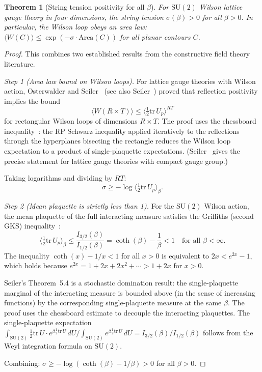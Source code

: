 \documentclass[11pt]{article}
\newtheorem{theorem}{Theorem}[section]
\theoremstyle{definition}
\newcommand{\SU}{\mathrm{SU}}
\newcommand{\tr}{\mathrm{tr}}
\begin{document}
\begin{theorem}[String tension positivity for all $\beta$]
\label{thm:string}
For $\SU(2)$ Wilson lattice gauge theory in four dimensions, the string
tension $\sigma(\beta)>0$ for all $\beta>0$.  In particular, the Wilson
loop obeys an area law: $\langle W(C)\rangle\le\exp(-\sigma\cdot
\mathrm{Area}(C))$ for all planar contours $C$.
\end{theorem}

\begin{proof}
This combines two established results from the constructive field
theory literature.

\emph{Step 1 (Area law bound on Wilson loops).}
For lattice gauge theories with Wilson action,
Osterwalder and Seiler~\cite{OS78} (see also
Seiler~\cite[Chapter~6]{Seiler82}) proved that reflection positivity
implies the bound
\begin{equation}\label{eq:wilson-area}
\langle W(R\times T)\rangle
\le\bigl\langle\tfrac{1}{2}\tr\,U_p\bigr\rangle^{RT}
\end{equation}
for rectangular Wilson loops of dimensions $R\times T$.  The proof
uses the chessboard inequality~\cite[Theorem~4.1]{Seiler82}:
the RP Schwarz inequality applied iteratively to the reflections
through the hyperplanes bisecting the rectangle reduces the Wilson
loop expectation to a product of single-plaquette expectations.
(Seiler~\cite[Theorem~6.1]{Seiler82} gives the precise statement
for lattice gauge theories with compact gauge group.)

Taking logarithms and dividing by $RT$:
\begin{equation}
\sigma\ge-\log\bigl\langle\tfrac{1}{2}\tr\,U_p\bigr\rangle_\beta.
\end{equation}

\emph{Step 2 (Mean plaquette is strictly less than 1).}
For the $\SU(2)$ Wilson action, the mean plaquette of the full
interacting measure satisfies the Griffiths (second GKS)
inequality~\cite[Theorem~5.4]{Seiler82}:
\begin{equation}\label{eq:griffiths}
\bigl\langle\tfrac{1}{2}\tr\,U_p\bigr\rangle_\beta
\le\frac{I_{3/2}(\beta)}{I_{1/2}(\beta)}
=\coth(\beta)-\frac{1}{\beta}<1\quad\text{for all $\beta<\infty$.}
\end{equation}
The inequality $\coth(x)-1/x<1$ for all $x>0$ is equivalent
to $2x<e^{2x}-1$, which holds because
$e^{2x}=1+2x+2x^2+\cdots>1+2x$ for $x>0$.

Seiler's Theorem~5.4 is a stochastic domination result: the
single-plaquette marginal of the interacting measure is bounded
above (in the sense of increasing functions) by the corresponding
single-plaquette measure at the same $\beta$.  The proof uses
the chessboard estimate to decouple the interacting plaquettes.
The single-plaquette expectation
$\int_{\SU(2)}\frac{1}{2}\tr\,U\cdot
e^{\beta\frac{1}{2}\tr\,U}\,dU
/\int_{\SU(2)}e^{\beta\frac{1}{2}\tr\,U}\,dU
=I_{3/2}(\beta)/I_{1/2}(\beta)$
follows from the Weyl integration formula on $\SU(2)$.

Combining: $\sigma\ge-\log(\coth(\beta)
-1/\beta)>0$ for all $\beta>0$.
\end{proof}
\end{document}
